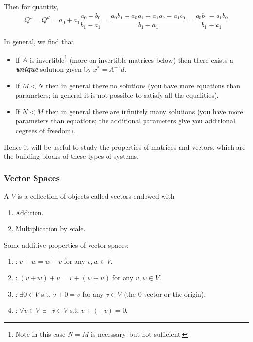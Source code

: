 \documentclass{article}
\begin{document}
Then for quantity,
\begin{align*}
  Q^s
  =
  Q^d
  =
  a_0 + a_1 \dfrac{a_0 - b_0}{b_1 - a_1}
  =
  \dfrac{a_0 b_1 - a_0 a_1 + a_1 a_0 - a_1 b_0}{b_1 - a_1}
  =
  \dfrac{a_0 b_1 - a_1 b_0}{b_1 - a_1}
\end{align*}

In general, we find that
\begin{itemize}[label=$\bullet$]
  \item If $A$ is invertible\footnote{Note in this case $N = M$ is necessary, but not sufficient.} (more on invertible matrices below) then there exists a \textbf{\textit{unique}} solution given by $x^* = A^{-1} d$.

  \item If $M < N$ then in general there no solutions (you have more equations than parameters; in general it is not possible to satisfy all the equalities).

  \item If $N < M$ then in general there are infinitely many solutions (you have more parameters than equations; the additional parameters give you additional degrees of freedom).
\end{itemize}

Hence it will be useful to study the properties of matrices and vectors, which are the building blocks of these types of systems.

\subsubsection{Vector Spaces}
\label{ssub:vector_spaces}

\begin{definition}
  A  $V$ is a collection of objects called vectors endowed with
  \begin{enumerate}
    \item Addition.
    \item Multiplication by scale.
  \end{enumerate}
\end{definition}

Some additive properties of vector spaces:
\begin{enumerate}
  \item {}: $v + w = w + v$ for any $v, w \in V$.
  \item {}: $(v + w) + u = v + (w + u)$ for any $v, w \in V$.
  \item {}: $\exists 0 \in V$ s.t. $v + 0 = v$ for any $v \in V$ (the $0$ vector or the origin).
  \item {}: $\forall v \in V ~~ \exists -v \in V$ s.t. $v + (-v) = 0$.
\end{enumerate}
\end{document}
